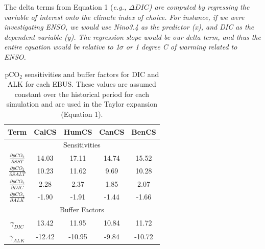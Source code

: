 \documentclass[12pt]{article}
\begin{document}
\vspace{0.5cm}
The delta terms from Equation 1 (\it e.g.\rm, $\Delta DIC$) are computed by regressing the variable of interest onto the climate index of choice. For instance, if we were investigating ENSO, we would use Nino3.4 as the predictor (x), and DIC as the dependent variable (y). The regression slope would be our delta term, and thus the entire equation would be relative to 1$\sigma$ or 1 degree C of warming related to ENSO.

\clearpage
\begin{table}
	\centering
	\caption{pCO$_{2}$ sensitivities and buffer factors for DIC and ALK for each EBUS. These values are assumed constant over the historical period for each simulation and are used in the Taylor expansion (Equation 1).}	
	\begin{tabular}{c c c c c}
		\toprule
		Term & CalCS  &  HumCS &  CanCS & BenCS \\
		\midrule
		\multicolumn{5}{c}{Sensitivities}  \\[0.1cm]
		$\frac{\partial pCO_{2}}{\partial SST}$ &  14.03 & 17.11  & 14.74 & 15.52 \\ [0.5cm]
		$\frac{\partial pCO_{2}}{\partial SALT}$ &  10.23 & 11.62 & 9.69 & 10.28 \\ [0.5cm]
		$\frac{\partial pCO_{2}}{\partial DIC}$ &  2.28 & 2.37 & 1.85 & 2.07 \\ [0.5cm]
		$\frac{\partial pCO_{2}}{\partial ALK}$ &  -1.90 & -1.91 & -1.44 & -1.66 \\ 
		\midrule
		\multicolumn{5}{c}{Buffer Factors}  \\ [0.1cm]
		$\gamma_{DIC}$ & 13.42 & 11.95 & 10.84 & 11.72 \\ [0.5cm]
		$\gamma_{ALK}$ & -12.42 & -10.95 & -9.84 & -10.72 \\ 
		\bottomrule
	\end{tabular}
	\label{tab:pCO2-sensitivities}
\end{table}
\end{document}
